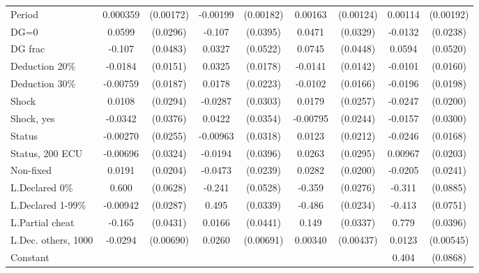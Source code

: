 \begin{tabular}{l|cccccc|cc}
Period          & 0.000359         &(0.00172)& -0.00199         &(0.00182)&  0.00163         &(0.00124)&  0.00114         &(0.00192)\\
DG=0          &   0.0599\sym{**} & (0.0296)&   -0.107\sym{***}& (0.0395)&   0.0471         & (0.0329)&  -0.0132         & (0.0238)\\
DG frac         &   -0.107\sym{**} & (0.0483)&   0.0327         & (0.0522)&   0.0745\sym{*}  & (0.0448)&   0.0594         & (0.0520)\\
Deduction 20\%&  -0.0184         & (0.0151)&   0.0325\sym{*}  & (0.0178)&  -0.0141         & (0.0142)&  -0.0101         & (0.0160)\\
Deduction 30\%& -0.00759         & (0.0187)&   0.0178         & (0.0223)&  -0.0102         & (0.0166)&  -0.0196         & (0.0198)\\
Shock         &   0.0108         & (0.0294)&  -0.0287         & (0.0303)&   0.0179         & (0.0257)&  -0.0247         & (0.0200)\\
Shock, yes    &  -0.0342         & (0.0376)&   0.0422         & (0.0354)& -0.00795         & (0.0244)&  -0.0157         & (0.0300)\\
Status        & -0.00270         & (0.0255)& -0.00963         & (0.0318)&   0.0123         & (0.0212)&  -0.0246         & (0.0168)\\
Status, 200 ECU& -0.00696         & (0.0324)&  -0.0194         & (0.0396)&   0.0263         & (0.0295)&  0.00967         & (0.0203)\\
Non-fixed     &   0.0191         & (0.0204)&  -0.0473\sym{**} & (0.0239)&   0.0282         & (0.0200)&  -0.0205         & (0.0241)\\
L.Declared 0\%&    0.600\sym{***}& (0.0628)&   -0.241\sym{***}& (0.0528)&   -0.359\sym{***}& (0.0276)&   -0.311\sym{***}& (0.0885)\\
L.Declared 1-99\%& -0.00942         & (0.0287)&    0.495\sym{***}& (0.0339)&   -0.486\sym{***}& (0.0234)&   -0.413\sym{***}& (0.0751)\\
L.Partial cheat &   -0.165\sym{***}& (0.0431)&   0.0166         & (0.0441)&    0.149\sym{***}& (0.0337)&    0.779\sym{***}& (0.0396)\\
L.Dec. others, 1000&  -0.0294\sym{***}&(0.00690)&   0.0260\sym{***}&(0.00691)&  0.00340         &(0.00437)&   0.0123\sym{**} &(0.00545)\\
Constant        &                  &         &                  &         &                  &         &    0.404\sym{***}& (0.0868)\\

\end{tabular}

